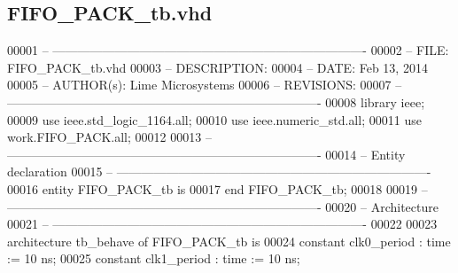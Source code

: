 \subsection{F\+I\+F\+O\+\_\+\+P\+A\+C\+K\+\_\+tb.\+vhd}
\label{FIFO__PACK__tb_8vhd_source}

\begin{DoxyCode}
00001 \textcolor{keyword}{-- ---------------------------------------------------------------------------- }
00002 \textcolor{keyword}{-- FILE:    FIFO\_PACK\_tb.vhd}
00003 \textcolor{keyword}{-- DESCRIPTION: }
00004 \textcolor{keyword}{-- DATE:    Feb 13, 2014}
00005 \textcolor{keyword}{-- AUTHOR(s):   Lime Microsystems}
00006 \textcolor{keyword}{-- REVISIONS:}
00007 \textcolor{keyword}{-- ---------------------------------------------------------------------------- }
00008 \textcolor{vhdlkeyword}{library }\textcolor{keywordflow}{ieee};
00009 \textcolor{vhdlkeyword}{use }ieee.std\_logic\_1164.\textcolor{keywordflow}{all};
00010 \textcolor{vhdlkeyword}{use }ieee.numeric\_std.\textcolor{keywordflow}{all};
00011 \textcolor{vhdlkeyword}{use }work.FIFO_PACK.\textcolor{keywordflow}{all};
00012 
00013 \textcolor{keyword}{-- ----------------------------------------------------------------------------}
00014 \textcolor{keyword}{-- Entity declaration}
00015 \textcolor{keyword}{-- ----------------------------------------------------------------------------}
00016 \textcolor{keywordflow}{entity }FIFO_PACK_tb \textcolor{keywordflow}{is}
00017 \textcolor{keywordflow}{end} \textcolor{vhdlchar}{FIFO\_PACK\_tb};
00018 
00019 \textcolor{keyword}{-- ----------------------------------------------------------------------------}
00020 \textcolor{keyword}{-- Architecture}
00021 \textcolor{keyword}{-- ----------------------------------------------------------------------------}
00022 
00023 \textcolor{keywordflow}{architecture} tb\_behave \textcolor{keywordflow}{of} FIFO_PACK_tb is
00024    \textcolor{keywordflow}{constant} \textcolor{vhdlchar}{clk0_period}    \textcolor{vhdlchar}{:} \textcolor{comment}{time} \textcolor{vhdlchar}{:=} \textcolor{vhdllogic}{}\textcolor{vhdllogic}{10} \textcolor{vhdlchar}{ns};
00025    \textcolor{keywordflow}{constant} \textcolor{vhdlchar}{clk1_period}    \textcolor{vhdlchar}{:} \textcolor{comment}{time} \textcolor{vhdlchar}{:=} \textcolor{vhdllogic}{}\textcolor{vhdllogic}{10} \textcolor{vhdlchar}{ns}; 

\end{DoxyCode}
